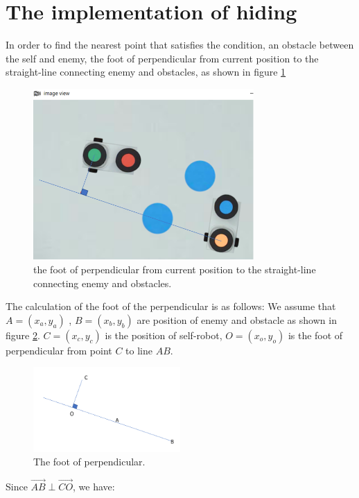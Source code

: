 \section{The implementation of hiding}
In order to find the nearest point that satisfies the condition, an obstacle between the self and enemy, the foot of perpendicular from current position to the straight-line connecting enemy and obstacles, as shown in figure \ref{hiding_implement1}

\begin{figure}[thb]
    \centering
    \includegraphics[width=0.75\textwidth]{images/implementofhiding1.png}
    \caption[he foot of perpendicular from current position to the straight-line connecting enemy and obstacles]{the foot of perpendicular from current position to the straight-line connecting enemy and obstacles.}\label{hiding_implement1}
\end{figure}

The calculation of the foot of the perpendicular is as follows:
We assume that $A=(x_{a},y_{a})$ ,  $B=(x_{b},y_{b})$ are position of enemy and obstacle as shown in figure \ref{hiding_implement2}. $C=(x_{c},y_{c})$ is the position of self-robot, $O=(x_{o},y_{o})$ is the foot of perpendicular from point $C$ to line $AB$.

\begin{figure}[thb]
    \centering
    \includegraphics[width=0.5\textwidth]{images/implementofhiding2.png}
    \caption[The foot of perpendicular]{The foot of perpendicular.}\label{hiding_implement2}
\end{figure}
Since $\overrightarrow{AB} \perp  \overrightarrow{CO}$, we have:


